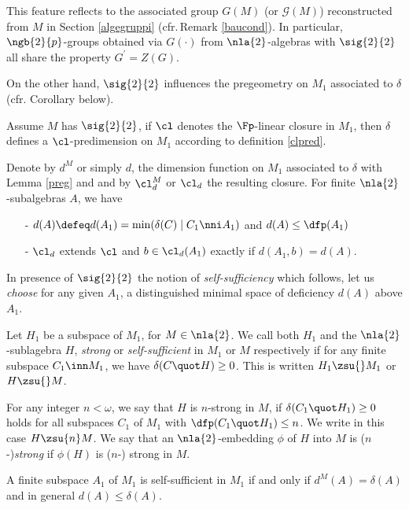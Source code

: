 This feature reflects to the associated group $G(M)$ (or $\mathscr{G}(M)$) reconstructed from $M$
in Section \ref{algegruppi} (cfr.{\,}Remark \ref{baucond}).
In particular, $\ngb{2}{p}$-groups obtained via $G(\cdot)$ from $\nla{2}$-algebras with $\sig{2}{2}$ all share the property
$G^{\prime}=Z(G)$.

On the other hand, $\sig{2}{2}$ influences the pregeometry on $M_{1}$ associated to $\delta$ (cfr.{ }Corollary  below).

\smallskip
\begin{rem}\label{preg2}
Assume $M$ has $\sig{2}{2}$, if $\cl$ denotes the $\Fp$-linear closure in $M_{1}$, then
$\delta$ defines a $\cl$-predimension on $M_{1}$ according to definition \ref{clpred}.

Denote by $d^{M}$ or simply $d$,
the dimension function on $M_{1}$ associated to $\delta$
with Lemma \ref{preg} and and by $\cl_{d}^{M}$ or $\cl_{d}$ the resulting closure. For finite $\nla{2}$-subalgebras $A$, we have
\begin{itemize}
\item[-]$d(A)\defeq d(A_{1})=\min(\delta(C)\mid C_{1}\nni A_{1})$ and $d(A)\leq\dfp(A_{1})$
\item[-]$\cl_{d}$ extends $\cl$ and $b\in\cl_{d}(A_{1})$ exactly if $d(A_{1},b)=d(A)$.
\end{itemize}
\end{rem}

\smallskip
In presence of $\sig{2}{2}$ the notion of {\em self-sufficiency} which follows, let us {\em choose} for any given $A_{1}$, a distinguished
minimal space of deficiency $d(A)$ above $A_{1}$.

\begin{dfn}\label{2strong}
Let $H_{1}$ be a subspace of $M_{1}$, for $M\in\nla{2}$.
We call both $H_{1}$ and the $\nla{2}$-sublagebra $H$,
\emph{strong} or \emph{self-sufficient} in $M_{1}$ or $M$ respectively if
for any finite subspace $C_{1}\inn M_{1}$, we have $\delta(C\quot H)\geq0$.
This is written $H_{1}\zsu{}M_{1}$ or $H\zsu{}M$.

For any integer $n<\omega$, we say that $H$ is $n$-strong in $M$, if
$\delta(C_{1}\quot H_{1})\geq0$ holds for all subspaces $C_{1}$ of $M_{1}$
with $\dfp(C_{1}\quot H_{1})\leq n$. We write in this case $H\zsu{n}M$.
We say that an $\nla{2}$-embedding $\phi$ of $H$ into $M$ is ($n$-){\em strong} %
if $\phi(H)$ is ($n$-) strong in $M$. %
\end{dfn}
\begin{rem}\label{deltadi}
A finite subspace $A_{1}$ of $M_{1}$ is self-sufficient in $M_{1}$ if and only if $d^{M}(A)=\delta(A)$ and
in general $d(A)\leq\delta(A)$.
\end{rem}

